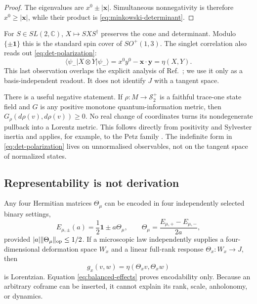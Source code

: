 \documentclass[11pt]{article}
\theoremstyle{remark}
\newcommand{\id}{\mathbf 1}
\begin{document}
\begin{proof}
The eigenvalues are $x^0\pm|\bm x|$.  Simultaneous nonnegativity is therefore
$x^0\geq|\bm x|$, while their product is \eqref{eq:minkowski-determinant}.
\end{proof}

For $S\in SL(2,\mathbb C)$, $X\mapsto SXS^\dagger$ preserves the cone and determinant.
Modulo $\{\pm\id\}$ this is the standard spin cover of $SO^+(1,3)$.  The singlet
correlation also reads out \eqref{eq:det-polarization}:
\begin{equation}
 \langle\psi_-|X\otimes Y|\psi_-\rangle
 =x^0y^0-\bm x\cdot\bm y=\eta(X,Y).
 \label{eq:singlet-metric}
\end{equation}
This last observation overlaps the explicit analysis of Ref.~\cite{FullwoodLorentz}; we
use it only as a basis-independent readout.  It does not identify $J$ with a tangent
space.

There is a useful negative statement.  If $\rho:M\to\mathcal S_2^+$ is a faithful
trace-one state field and $G$ is any positive monotone quantum-information metric, then
$G_\rho(d\rho(v),d\rho(v))\geq0$.  No real change of coordinates turns its nondegenerate
pullback into a Lorentz metric.  This follows directly from positivity and Sylvester
inertia and applies, for example, to the Petz family \cite{PetzMonotone}.  The indefinite
form in \eqref{eq:det-polarization} lives on unnormalised observables, not on the tangent
space of normalized states.

\subsection{Representability is not derivation}

Any four Hermitian matrices $\Theta_\mu$ can be encoded in four independently selected
binary settings,
\begin{equation}
 E_{\mu,\pm}(a)=\frac12\id\pm a\Theta_\mu,
 \qquad
 \Theta_\mu=\frac{E_{\mu,+}-E_{\mu,-}}{2a},
 \label{eq:balanced-effects}
\end{equation}
provided $|a|\|\Theta_\mu\|_{\rm op}\leq1/2$.  If a microscopic law independently
supplies a four-dimensional deformation space $W_x$ and a linear full-rank response
$\Theta_x:W_x\to J$, then
\begin{equation}
 g_x(v,w)=\eta(\Theta_xv,\Theta_xw)
 \label{eq:solder-pullback}
\end{equation}
is Lorentzian.  Equation \eqref{eq:balanced-effects} proves encodability only.  Because an
arbitrary coframe can be inserted, it cannot explain its rank, scale, anholonomy, or
dynamics.
\end{document}
